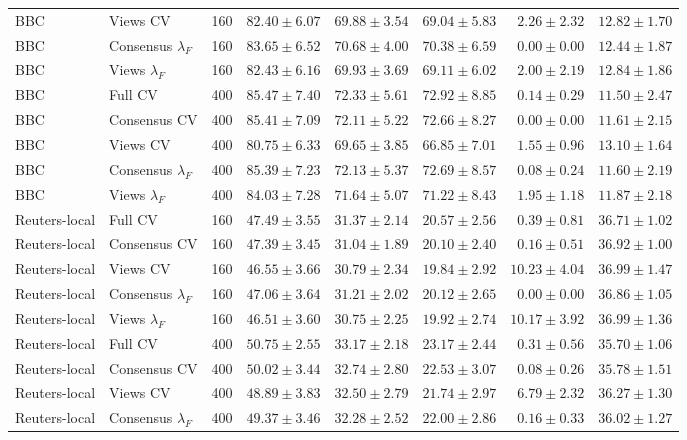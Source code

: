 \begin{longtable}{llrrrrrr}
BBC & Views CV & 160 & $82.40\pm6.07$ & $69.88\pm3.54$ & $69.04\pm5.83$ & $2.26\pm2.32$ & $12.82\pm1.70$\\
BBC & Consensus $\lambda_F$ & 160 & $83.65\pm6.52$ & $70.68\pm4.00$ & $70.38\pm6.59$ & $0.00\pm0.00$ & $12.44\pm1.87$\\
BBC & Views $\lambda_F$ & 160 & $82.43\pm6.16$ & $69.93\pm3.69$ & $69.11\pm6.02$ & $2.00\pm2.19$ & $12.84\pm1.86$\\
BBC & Full CV & 400 & $85.47\pm7.40$ & $72.33\pm5.61$ & $72.92\pm8.85$ & $0.14\pm0.29$ & $11.50\pm2.47$\\
BBC & Consensus CV & 400 & $85.41\pm7.09$ & $72.11\pm5.22$ & $72.66\pm8.27$ & $0.00\pm0.00$ & $11.61\pm2.15$\\
BBC & Views CV & 400 & $80.75\pm6.33$ & $69.65\pm3.85$ & $66.85\pm7.01$ & $1.55\pm0.96$ & $13.10\pm1.64$\\
BBC & Consensus $\lambda_F$ & 400 & $85.39\pm7.23$ & $72.13\pm5.37$ & $72.69\pm8.57$ & $0.08\pm0.24$ & $11.60\pm2.19$\\
BBC & Views $\lambda_F$ & 400 & $84.03\pm7.28$ & $71.64\pm5.07$ & $71.22\pm8.43$ & $1.95\pm1.18$ & $11.87\pm2.18$\\
Reuters-local & Full CV & 160 & $47.49\pm3.55$ & $31.37\pm2.14$ & $20.57\pm2.56$ & $0.39\pm0.81$ & $36.71\pm1.02$\\
Reuters-local & Consensus CV & 160 & $47.39\pm3.45$ & $31.04\pm1.89$ & $20.10\pm2.40$ & $0.16\pm0.51$ & $36.92\pm1.00$\\
Reuters-local & Views CV & 160 & $46.55\pm3.66$ & $30.79\pm2.34$ & $19.84\pm2.92$ & $10.23\pm4.04$ & $36.99\pm1.47$\\
Reuters-local & Consensus $\lambda_F$ & 160 & $47.06\pm3.64$ & $31.21\pm2.02$ & $20.12\pm2.65$ & $0.00\pm0.00$ & $36.86\pm1.05$\\
Reuters-local & Views $\lambda_F$ & 160 & $46.51\pm3.60$ & $30.75\pm2.25$ & $19.92\pm2.74$ & $10.17\pm3.92$ & $36.99\pm1.36$\\
Reuters-local & Full CV & 400 & $50.75\pm2.55$ & $33.17\pm2.18$ & $23.17\pm2.44$ & $0.31\pm0.56$ & $35.70\pm1.06$\\
Reuters-local & Consensus CV & 400 & $50.02\pm3.44$ & $32.74\pm2.80$ & $22.53\pm3.07$ & $0.08\pm0.26$ & $35.78\pm1.51$\\
Reuters-local & Views CV & 400 & $48.89\pm3.83$ & $32.50\pm2.79$ & $21.74\pm2.97$ & $6.79\pm2.32$ & $36.27\pm1.30$\\
Reuters-local & Consensus $\lambda_F$ & 400 & $49.37\pm3.46$ & $32.28\pm2.52$ & $22.00\pm2.86$ & $0.16\pm0.33$ & $36.02\pm1.27$\\

\end{longtable}
